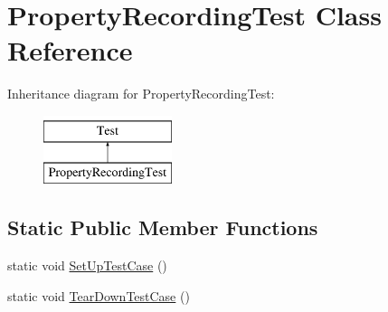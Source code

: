 \hypertarget{class_property_recording_test}{\section{Property\-Recording\-Test Class Reference}
\label{class_property_recording_test}
}
Inheritance diagram for Property\-Recording\-Test\-:\begin{figure}[H]
\begin{center}
\leavevmode
\includegraphics[height=2.000000cm]{class_property_recording_test}
\end{center}
\end{figure}
\subsection*{Static Public Member Functions}
\begin{DoxyCompactItemize}
\item 
static void \hyperlink{class_property_recording_test_a673c9dfcd9f0c8d10d0df765852c1669}{Set\-Up\-Test\-Case} ()
\item 
static void \hyperlink{class_property_recording_test_ac0d2d47efbdc4399777dffca6071d15d}{Tear\-Down\-Test\-Case} ()
\end{DoxyCompactItemize}



